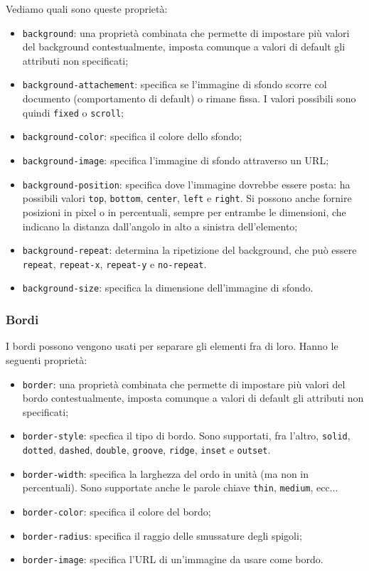 \documentclass[a4paper,11pt]{article}
\begin{document}
Vediamo quali sono queste proprietà:
\begin{itemize}
	\item \lstinline|background|: una proprietà combinata che permette di impostare più valori del background contestualmente, imposta comunque a valori di default gli attributi non specificati;
	\item \lstinline|background-attachement|: specifica se l'immagine di sfondo scorre col documento (comportamento di default) o rimane fissa. I valori possibili sono quindi \lstinline|fixed| o \lstinline|scroll|;
	\item \lstinline|background-color|: specifica il colore dello sfondo;
	\item \lstinline|background-image|: specifica l'immagine di sfondo attraverso un URL;
	\item \lstinline|background-position|: specifica dove l'immagine dovrebbe essere posta: ha possibili valori \lstinline|top|, \lstinline|bottom|, \lstinline|center|, \lstinline|left| e \lstinline|right|.
		Si possono anche fornire posizioni in pixel o in percentuali, sempre per entrambe le dimensioni, che indicano la distanza dall'angolo in alto a sinistra dell'elemento;
	\item \lstinline|background-repeat|: determina la ripetizione del background, che può essere \lstinline|repeat|, \lstinline|repeat-x|, \lstinline|repeat-y| e \lstinline|no-repeat|.
	\item \lstinline|background-size|: specifica la dimensione dell'immagine di sfondo.
\end{itemize}

\subsubsection{Bordi}
I bordi possono vengono usati per separare gli elementi fra di loro.
Hanno le seguenti proprietà:
\begin{itemize}
	\item \lstinline|border|: una proprietà combinata che permette di impostare più valori del bordo contestualmente, imposta comunque a valori di default gli attributi non specificati;
	\item \lstinline|border-style|: specfica il tipo di bordo. Sono supportati, fra l'altro, \lstinline|solid|, \lstinline|dotted|, \lstinline|dashed|, \lstinline|double|, \lstinline|groove|, \lstinline|ridge|, \lstinline|inset| e \lstinline|outset|.
	\item \lstinline|border-width|: specifica la larghezza del ordo in unità (ma non in percentuali).
		Sono supportate anche le parole chiave \lstinline|thin|, \lstinline|medium|, ecc...
	\item \lstinline|border-color|: specifica il colore del bordo;
	\item \lstinline|border-radius|: specifica il raggio delle smussature degli spigoli;
	\item \lstinline|border-image|: specifica l'URL di un'immagine da usare come bordo.
\end{itemize}
\end{document}
